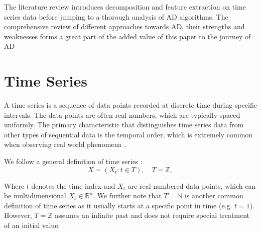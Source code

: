 The literature review introduces decomposition and feature extraction on time series data before jumping to a thorough analysis of AD algorithms. The comprehensive review of different approaches towards AD, their strengths and weaknesses forms a great part of the added value of this paper to the journey of AD


\section{Time Series}
\label{sec:time_series}
A time series is a sequence of data points recorded at discrete time during specific intervals. The data points are often real numbers, which are typically spaced uniformly. The primary characteristic that distinguishes time series data from other types of sequential data is the temporal order, which is extremely common when observing real world phenomena \cite{Cryer2009}. 

We follow a general definition of time series \cite{Kreis2006}:
\begin{equation}
    \label{eq:time_series}
    X = (X_t : t \in T), \quad T = \mathbb{Z},
\end{equation}

Where $t$ denotes the time index and $X_t$ are real-numbered data points, which can be multidimensional $X_t \in \mathbb{R}^n$. We further note that $T = \mathbb{N}$ is another common definition of time series as it usually starts at a specific point in time (e.g. $t=1$). However, $T=\mathbb{Z}$ assumes an infinite past and does not require special treatment of an initial value.

